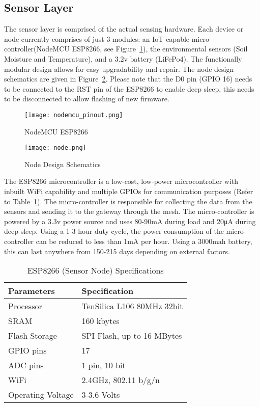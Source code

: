 \subsection{Sensor Layer}
  The sensor layer is comprised of the actual sensing hardware. Each device or node currently comprises of just 3 modules: an IoT capable micro-controller(NodeMCU ESP8266, see Figure~\ref{fig:nodemcu}), the environmental sensors (Soil Moisture and Temperature), and a 3.2v battery (LiFePo4). The functionally modular design allows for easy upgradability and repair. The node design schematics are given in Figure~\ref{fig:node}. Please note that the D0 pin (GPIO 16) needs to be connected to the RST pin of the ESP8266 to enable deep sleep, this needs to be disconnected to allow flashing of new firmware.

  \begin{figure}[!h]
    \centering
    \texttt{[image: nodemcu\_pinout.png]}
    \caption{NodeMCU ESP8266}
    \label{fig:nodemcu}
  \end{figure}
  
  \begin{figure}[!h]
    \centering
    \texttt{[image: node.png]}
    \caption{Node Design Schematics}
    \label{fig:node}
  \end{figure}

  The ESP8266 microcontroller is a low-cost, low-power microcontroller with inbuilt WiFi capability and multiple GPIOs for communication purposes (Refer to Table~\ref{table:nodespecs}). The micro-controller is responsible for collecting the data from the sensors and sending it to the gateway through the mesh. The micro-controller is powered by a 3.3v power source and uses 80-90mA during load and 20\si{\micro\ampere} during deep sleep. Using a 1-3 hour duty cycle, the power consumption of the micro-controller can be reduced to less than 1mA per hour. Using a 3000mah battery, this can last anywhere from 150-215 days depending on external factors.
  
  \begin{table}[!h]
    \centering
    \begin{tabular}{ p{5cm} p{5cm}}
      \hline
      \textbf{Parameters} & \textbf{Specification}\\
      \hline
      Processor & TenSilica L106 80MHz 32bit\\
      SRAM & 160 kbytes\\
      Flash Storage & SPI Flash, up to 16 MBytes\\
      GPIO pins & 17\\
      ADC pins & 1 pin, 10 bit\\
      WiFi & 2.4GHz, 802.11 b/g/n\\
      Operating Voltage & 3-3.6 Volts\\
      \hline
    \end{tabular}
    \caption{ESP8266 (Sensor Node) Specifications} 
    \label{table:nodespecs}
  \end{table}

